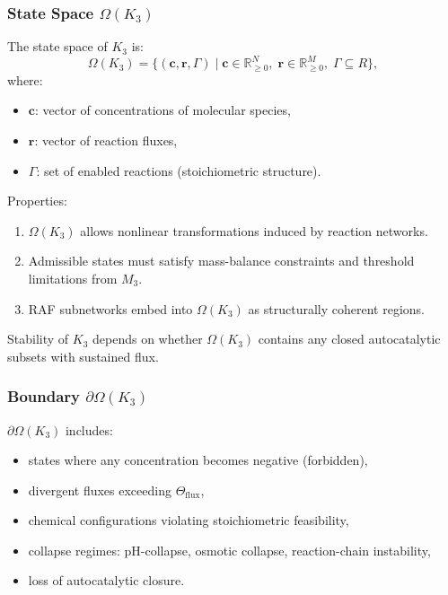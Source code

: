 \subsubsection{State Space \texorpdfstring{$\Omega(K_3)$}{\Omega(K_3)}}

The state space of $K_3$ is:
\[
\Omega(K_3) = \{ (\mathbf{c}, \mathbf{r}, \Gamma) \mid 
\mathbf{c} \in \mathbb{R}_{\ge0}^N,\;
\mathbf{r} \in \mathbb{R}_{\ge0}^M,\;
\Gamma \subseteq R \},
\]
where:
\begin{itemize}
    \item $\mathbf{c}$: vector of concentrations of molecular species,
    \item $\mathbf{r}$: vector of reaction fluxes,
    \item $\Gamma$: set of enabled reactions (stoichiometric structure).
\end{itemize}

Properties:
\begin{enumerate}
    \item $\Omega(K_3)$ allows nonlinear transformations induced by
          reaction networks.
    \item Admissible states must satisfy mass-balance constraints and
          threshold limitations from $M_3$.
    \item RAF subnetworks embed into $\Omega(K_3)$ as structurally
          coherent regions.
\end{enumerate}

Stability of $K_3$ depends on whether $\Omega(K_3)$ contains any closed
autocatalytic subsets with sustained flux.

\subsubsection{Boundary \texorpdfstring{$\partial\Omega(K_3)$}{\partial\Omega(K_3)}}

$\partial\Omega(K_3)$ includes:
\begin{itemize}
    \item states where any concentration becomes negative (forbidden),
    \item divergent fluxes exceeding $\Theta_{\mathrm{flux}}$,
    \item chemical configurations violating stoichiometric feasibility,
    \item collapse regimes: pH-collapse, osmotic collapse,
          reaction-chain instability,
    \item loss of autocatalytic closure.
\end{itemize}

